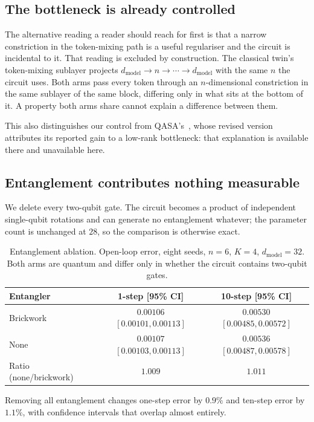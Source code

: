 \documentclass[11pt,onecolumn]{article}
\newif\ifdraft
\newcommand{\pend}[1]{%
  \ifdraft\textcolor{PendFG}{\textbf{[}\textit{#1}\textbf{]}}\fi}
\begin{document}
\subsection{The bottleneck is already controlled}
The alternative reading a reader should reach for first is that a narrow
constriction in the token-mixing path is a useful regulariser and the
circuit is incidental to it. That reading is excluded by construction.
The classical twin's token-mixing sublayer projects
$d_{\mathrm{model}} \rightarrow n \rightarrow \cdots \rightarrow
d_{\mathrm{model}}$ with the same $n$ the circuit uses. Both arms pass
every token through an $n$-dimensional constriction in the same sublayer
of the same block, differing only in what sits at the bottom of it. A
property both arms share cannot explain a difference between them.

This also distinguishes our control from QASA's~\cite{qasa}, whose
revised version attributes its reported gain to a low-rank bottleneck:
that explanation is available there and unavailable here.

\subsection{Entanglement contributes nothing measurable}
We delete every two-qubit gate. The circuit becomes a product of
independent single-qubit rotations and can generate no entanglement
whatever; the parameter count is unchanged at $28$, so the comparison is
otherwise exact.

\begin{table}[htb]\centering\small
\caption{Entanglement ablation. Open-loop error, eight seeds,
$n = 6$, $K = 4$, $d_{\mathrm{model}} = 32$. Both arms are quantum and
differ only in whether the circuit contains two-qubit gates.}
\label{tab:entangler}
\begin{tabular}{lcc}
\toprule
Entangler & 1-step [95\% CI] & 10-step [95\% CI] \\
\midrule
Brickwork & $0.00106$ $[0.00101, 0.00113]$ & $0.00530$ $[0.00485, 0.00572]$ \\
None      & $0.00107$ $[0.00103, 0.00113]$ & $0.00536$ $[0.00487, 0.00578]$ \\
\midrule
Ratio (none/brickwork) & $1.009$ & $1.011$ \\
\bottomrule
\end{tabular}
\end{table}

Removing all entanglement changes one-step error by $0.9\%$ and
ten-step error by $1.1\%$, with confidence intervals that overlap almost
entirely. \pend{paired permutation $p$ and minimum detectable ratio from
\texttt{ablation\_entanglement.py}}
\end{document}

